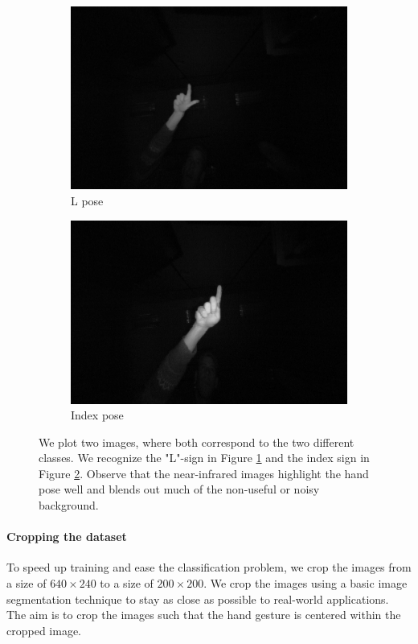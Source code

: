 \begin{figure}
    \centering
    \begin{subfigure}{0.49\textwidth}
    \includegraphics[width=.80\linewidth]{plotsAistats/Lpose.png}
    \caption{L pose}
    \label{fig:L_pose_or_example}
    \end{subfigure}
    \begin{subfigure}{0.49\textwidth}
    \includegraphics[width=.80\linewidth]{plotsAistats/Indexpose.png}
    \caption{Index pose}
    \label{fig:index_pose_or_example}
    \end{subfigure}
    \caption{We plot two images, where both correspond to the two different classes. We recognize the "L"-sign in Figure \ref{fig:L_pose_or_example} and the index sign in Figure \ref{fig:index_pose_or_example}. Observe that the near-infrared images highlight the hand pose well and blends out much of the non-useful or noisy background. }
\label{fig:original_examples}
\end{figure}

\paragraph{Cropping the dataset}
To speed up training and ease the classification problem, we crop the images from a size of $640 \times 240$ to a size of $200 \times 200$. We crop the images using a basic image segmentation technique to stay as close as possible to real-world applications. The aim is to crop the images such that the hand gesture is centered within the cropped image.

